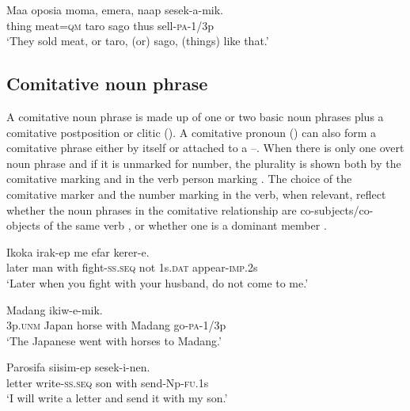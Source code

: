 \ea%
\label{ex:4:x818}
\gll Maa  oposia  moma,  emera,  naap  sesek-a-mik. \\
  thing  meat=\textsc{qm}  taro  sago  thus  sell-\textsc{pa}-1/3p    \\
\glt`They sold meat, or taro, (or) sago, (things) like that.'
\z

\subsection{Comitative noun phrase} \label{sec:4.1.3}
{}
A comitative noun phrase is made up of one or two basic noun phrases plus a comitative postposition or clitic (). A comitative pronoun () can also form a comitative phrase either by itself or attached to a   --. When there is only one overt noun phrase and if it  is unmarked for number, the plurality is shown both by the comitative marking and in the verb person marking . The choice of the comitative marker and the number marking in the verb, when relevant,  reflect whether the noun phrases in the comitative relationship are co-subjects/co-objects of the same verb , or whether one is a dominant member . 

\ea%
\label{ex:4:x828}
\gll Ikoka     irak-ep  me  efar  kerer-e. \\
   later  man  with  fight-\textsc{ss}.\textsc{seq}  not  1s.\textsc{dat}  appear-\textsc{imp}.2s   \\
\glt`Later when you fight with your husband, do not come to me.'
\z

\ea%
\label{ex:4:x829}
\gll {}     Madang  ikiw-e-mik. \\
    3p.\textsc{unm}  Japan  horse  with  Madang  go-\textsc{pa}-1/3p  \\
\glt`The Japanese went with horses to Madang.'
\z

\ea%
\label{ex:4:x830}
\gll Parosifa  siisim-ep     sesek-i-nen. \\
    letter  write-\textsc{ss}.\textsc{seq}  son  with  send-Np-\textsc{fu}.1s  \\
\glt`I will write a letter and send it with my son.'
\z


